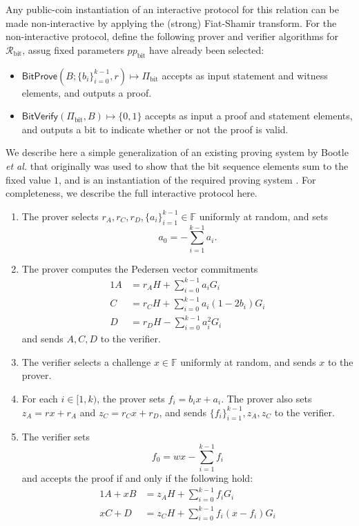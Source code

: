 \documentclass{article}
\newcommand{\F}{\mathbb{F}}
\newcommand{\func}[1]{\mathsf{#1}}
\begin{document}
Any public-coin instantiation of an interactive protocol for this relation can be made non-interactive by applying the (strong) Fiat-Shamir transform.
For the non-interactive protocol, define the following prover and verifier algorithms for $\mathcal{R}_{\text{bit}}$, assug fixed parameters $pp_{\text{bit}}$ have already been selected:
\begin{itemize}
	\item $\func{BitProve}\left( B ; \{b_i\}_{i=0}^{k-1}, r \right) \mapsto \Pi_{\text{bit}}$ accepts as input statement and witness elements, and outputs a proof.
	\item $\func{BitVerify}\left( \Pi_{\text{bit}}, B \right) \mapsto \{0, 1\}$ accepts as input a proof and statement elements, and outputs a bit to indicate whether or not the proof is valid.
\end{itemize}

We describe here a simple generalization of an existing proving system by Bootle \textit{et al.} that originally was used to show that the bit sequence elements sum to the fixed value $1$, and is an instantiation of the required proving system \cite{bootle}.
For completeness, we describe the full interactive protocol here.

\begin{enumerate}
\item The prover selects $r_A, r_C, r_D, \{a_i\}_{i=1}^{k-1} \in \F$ uniformly at random, and sets $$a_0 = -\sum_{i=1}^{k-1} a_i.$$
\item The prover computes the Pedersen vector commitments
\begin{alignat*}{1}
	A &= r_A H + \sum_{i=0}^{k-1} a_i G_i \\
	C &= r_C H + \sum_{i=0}^{k-1} a_i(1 - 2b_i)G_i \\
	D &= r_D H - \sum_{i=0}^{k-1} a_i^2 G_i
\end{alignat*}
and sends $A, C, D$ to the verifier.
\item The verifier selects a challenge $x \in \F$ uniformly at random, and sends $x$ to the prover.
\item For each $i \in [1,k)$, the prover sets $f_i = b_i x + a_i$.
The prover also sets $z_A = rx + r_A$ and $z_C = r_C x + r_D$, and sends $\{f_i\}_{i=1}^{k-1}, z_A, z_C$ to the verifier.
\item The verifier sets $$f_0 = wx - \sum_{i=1}^{k-1} f_i$$ and accepts the proof if and only if the following hold:
\begin{alignat*}{1}
	A + xB &= z_A H + \sum_{i=0}^{k-1} f_i G_i \\
	xC + D &= z_C H + \sum_{i=0}^{k-1} f_i(x - f_i)G_i		
\end{alignat*}
\end{enumerate}
\end{document}
